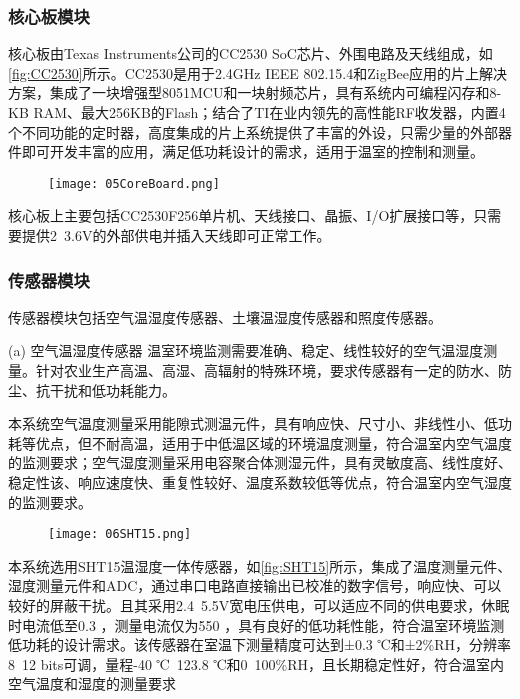 		\subsubsection{核心板模块}
		核心板由Texas Instruments公司的CC2530 SoC芯片、外围电路及天线组成，如\ref{fig:CC2530}所示。CC2530是用于2.4GHz IEEE 802.15.4和ZigBee应用的片上解决方案，集成了一块增强型8051MCU和一块射频芯片，具有系统内可编程闪存和8-KB RAM、最大256KB的Flash；结合了TI在业内领先的高性能RF收发器，内置4个不同功能的定时器，高度集成的片上系统提供了丰富的外设，只需少量的外部器件即可开发丰富的应用，满足低功耗设计的需求，适用于温室的控制和测量。
		\begin{figure}[!htp]
  			\centering
 			\texttt{[image: 05CoreBoard.png]}
		\end{figure}
		
		核心板上主要包括CC2530F256单片机、天线接口、晶振、I/O扩展接口等，只需要提供2~3.6V的外部供电并插入天线即可正常工作。
		\subsubsection{传感器模块}
		传感器模块包括空气温湿度传感器、土壤温湿度传感器和照度传感器。
		
		(a) 空气温湿度传感器
		温室环境监测需要准确、稳定、线性较好的空气温湿度测量。针对农业生产高温、高湿、高辐射的特殊环境，要求传感器有一定的防水、防尘、抗干扰和低功耗能力。
		
		本系统空气温度测量采用能隙式测温元件，具有响应快、尺寸小、非线性小、低功耗等优点，但不耐高温，适用于中低温区域的环境温度测量，符合温室内空气温度的监测要求；空气湿度测量采用电容聚合体测湿元件，具有灵敏度高、线性度好、稳定性该、响应速度快、重复性较好、温度系数较低等优点，符合温室内空气湿度的监测要求。
 		\begin{figure}[!htp]
  			\centering
 			\texttt{[image: 06SHT15.png]}
		\end{figure}
		本系统选用SHT15温湿度一体传感器，如\ref{fig:SHT15}所示，集成了温度测量元件、湿度测量元件和ADC，通过串口电路直接输出已校准的数字信号，响应快、可以较好的屏蔽干扰。且其采用2.4~5.5V宽电压供电，可以适应不同的供电要求，休眠时电流低至0.3 ，测量电流仅为550 ，具有良好的低功耗性能，符合温室环境监测低功耗的设计需求。该传感器在室温下测量精度可达到±0.3 ℃和±2\%RH，分辨率8~12 bits可调，量程-40 ℃~123.8 ℃和0~100\%RH，且长期稳定性好，符合温室内空气温度和湿度的测量要求
		
